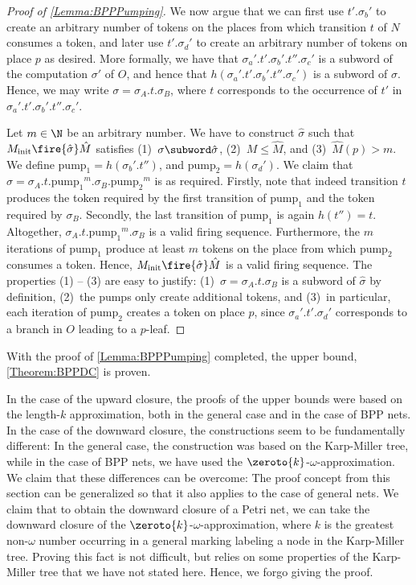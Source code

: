 \documentclass[../../diss.tex]{subfiles}
\begin{document}
\begin{proof}[Proof of \cref{Lemma:BPPPumping}]
    We now argue that we can first use $t'.\sigma_b'$ to create an arbitrary number of tokens on the places from which transition $t$ of $N$ consumes a token, and later use $t'.\sigma_d'$ to create an arbitrary number of tokens on place $p$ as desired.
%
    More formally, we have that $\sigma_a'.t'.\sigma_b'.t''.\sigma_c'$ is a subword of the computation $\sigma'$ of $O$, and hence that $h(\sigma_a'.t'.\sigma_b'.t''.\sigma_c')$ is a subword of $\sigma$.
    Hence, we may write $\sigma = \sigma_A.t.\sigma_B$, where $t$ corresponds to the occurrence of $t'$ in $\sigma_a'.t'.\sigma_b'.t''.\sigma_c'$.

    Let $m \in \N$ be an arbitrary number.
    We have to construct $\hat{\sigma}$ such that $\Minit \fire{\hat{\sigma}} \hat{M}$ satisfies
    (1)~$\sigma \subword \hat{\sigma}$,
    (2)~$M\leq \hat{M}$, and
    (3)~$\hat{M}(p)>m$.
    We define $\text{pump}_1 = h(\sigma_b'.t'')$, and $\text{pump}_2 = h(\sigma_d')$.
    We claim that $\hat{\sigma} = \sigma_A.t.{\text{pump}_1}^m.\sigma_B.{\text{pump}_2}^m$ is as required.
    Firstly, note that indeed transition $t$ produces the token required by the first transition of $\text{pump}_1$ and the token required by $\sigma_B$.
    Secondly, the last transition of $\text{pump}_1$ is again $h(t'') = t$.
    Altogether, $\sigma_A.t.{\text{pump}_1}^m.\sigma_B$ is a valid firing sequence.
    Furthermore, the $m$ iterations of $\text{pump}_1$ produce at least $m$ tokens on the place from which $\text{pump}_2$ consumes a token.
    Hence, $\Minit \fire{\hat{\sigma}} \hat{M}$ is a valid firing sequence.
    The properties (1) -- (3) are easy to justify: (1)~$\sigma = \sigma_A.t.\sigma_B$ is a subword of $\hat{\sigma}$ by definition, (2)~the pumps only create additional tokens, and (3)~in particular, each iteration of ${\text{pump}_2}$ creates a token on place $p$, since $\sigma_a'.t'.\sigma_d'$ corresponds to a branch in $O$ leading to a $p$-leaf.
\end{proof}

With the proof of \cref{Lemma:BPPPumping} completed, the upper bound, \cref{Theorem:BPPDC} is proven.

\begin{remark*}
In the case of the upward closure, the proofs of the upper bounds were based on the length-$k$ approximation, both in the general case and in the case of BPP nets.
In the case of the downward closure, the constructions seem to be fundamentally different:
In the general case, the construction was based on the Karp-Miller tree, while in the case of BPP nets, we have used the $\zeroto{k}$-$\omega$-approximation.
We claim that these differences can be overcome:
The proof concept from this section can be generalized so that it also applies to the case of general nets.
We claim that to obtain the downward closure of a Petri net, we can take the downward closure of the $\zeroto{k}$-$\omega$-approximation, where $k$ is the greatest non-$\omega$ number occurring in a general marking labeling a node in the Karp-Miller tree.
Proving this fact is not difficult, but relies on some properties of the Karp-Miller tree that we have not stated here.
Hence, we forgo giving the proof.
\end{remark*}
\end{document}
